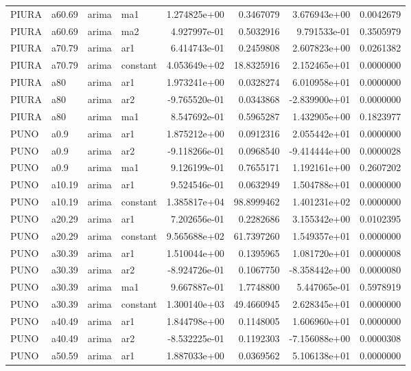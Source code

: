 \documentclass[
]{article}
\begin{document}
\begin{table}[!h]
\begin{tabular}[t]{llllrrrr}
PIURA & a60.69 & arima & ma1 & 1.274825e+00 & 0.3467079 & 3.676943e+00 & 0.0042679\\
\addlinespace
PIURA & a60.69 & arima & ma2 & 4.927997e-01 & 0.5032916 & 9.791533e-01 & 0.3505979\\
PIURA & a70.79 & arima & ar1 & 6.414743e-01 & 0.2459808 & 2.607823e+00 & 0.0261382\\
PIURA & a70.79 & arima & constant & 4.053649e+02 & 18.8325916 & 2.152465e+01 & 0.0000000\\
PIURA & a80 & arima & ar1 & 1.973241e+00 & 0.0328274 & 6.010958e+01 & 0.0000000\\
PIURA & a80 & arima & ar2 & -9.765520e-01 & 0.0343868 & -2.839900e+01 & 0.0000000\\
\addlinespace
PIURA & a80 & arima & ma1 & 8.547692e-01 & 0.5965287 & 1.432905e+00 & 0.1823977\\
PUNO & a0.9 & arima & ar1 & 1.875212e+00 & 0.0912316 & 2.055442e+01 & 0.0000000\\
PUNO & a0.9 & arima & ar2 & -9.118266e-01 & 0.0968540 & -9.414444e+00 & 0.0000028\\
PUNO & a0.9 & arima & ma1 & 9.126199e-01 & 0.7655171 & 1.192161e+00 & 0.2607202\\
PUNO & a10.19 & arima & ar1 & 9.524546e-01 & 0.0632949 & 1.504788e+01 & 0.0000000\\
\addlinespace
PUNO & a10.19 & arima & constant & 1.385817e+04 & 98.8999462 & 1.401231e+02 & 0.0000000\\
PUNO & a20.29 & arima & ar1 & 7.202656e-01 & 0.2282686 & 3.155342e+00 & 0.0102395\\
PUNO & a20.29 & arima & constant & 9.565688e+02 & 61.7397260 & 1.549357e+01 & 0.0000000\\
PUNO & a30.39 & arima & ar1 & 1.510044e+00 & 0.1395965 & 1.081720e+01 & 0.0000008\\
PUNO & a30.39 & arima & ar2 & -8.924726e-01 & 0.1067750 & -8.358442e+00 & 0.0000080\\
\addlinespace
PUNO & a30.39 & arima & ma1 & 9.667887e-01 & 1.7748800 & 5.447065e-01 & 0.5978919\\
PUNO & a30.39 & arima & constant & 1.300140e+03 & 49.4660945 & 2.628345e+01 & 0.0000000\\
PUNO & a40.49 & arima & ar1 & 1.844798e+00 & 0.1148005 & 1.606960e+01 & 0.0000000\\
PUNO & a40.49 & arima & ar2 & -8.532225e-01 & 0.1192303 & -7.156088e+00 & 0.0000308\\
PUNO & a50.59 & arima & ar1 & 1.887033e+00 & 0.0369562 & 5.106138e+01 & 0.0000000\\

\end{tabular}
\end{table}
\end{document}
